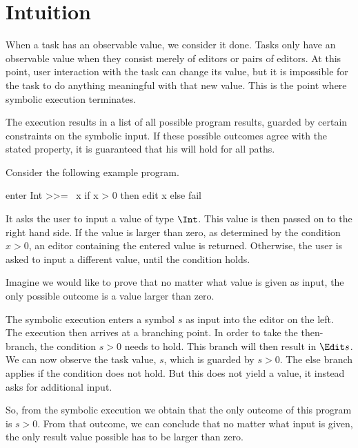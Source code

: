 


\section{Intuition}
\label{sec:intuition}

When a task has an observable value, we consider it done.
Tasks only have an observable value when they consist merely of editors or pairs of editors.
At this point, user interaction with the task can change its value, but it is impossible for the task to do anything meaningful with that new value.
This is the point where symbolic execution terminates.

The execution results in a list of all possible program results,
guarded by certain constraints on the symbolic input.
If these possible outcomes agree with the stated property,
it is guaranteed that his will hold for all paths.

\begin{example}
Consider the following example program.

\begin{TASK}
  enter Int >>= \ x if x > 0 then edit x else fail
\end{TASK}

It asks the user to input a value of type $\Int$.
This value is then passed on to the right hand side.
If the value is larger than zero, as determined by the condition $x>0$,
an editor containing the entered value is returned.
Otherwise, the user is asked to input a different value, until the condition holds.

Imagine we would like to prove that no matter what value is given as input,
the only possible outcome is a value larger than zero.

The symbolic execution enters a symbol $s$ as input into the editor on the left.
The execution then arrives at a branching point.
In order to take the then-branch, the condition $s > 0$ needs to hold.
This branch will then result in $\Edit s$.
We can now observe the task value, $s$, which is guarded by $s > 0$.
The else branch applies if the condition does not hold.
But this does not yield a value, it instead asks for additional input.

So, from the symbolic execution we obtain that the only outcome of this program is $s > 0$.
From that outcome, we can conclude that no matter what input is given, the only result value possible has to be larger than zero.
\label{example:abs}
\end{example}
